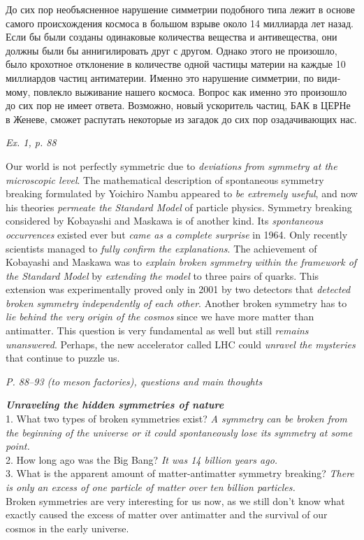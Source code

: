 \documentclass[a4paper, 12pt]{article}
\def\task#1{\begin{center}\it #1\end{center}}
\def\ans#1{\textit{#1}}
\begin{document}
\begin{otherlanguage}{russian}
	До сих пор необъясненное нарушение симметрии подобного типа лежит в основе самого 
	происхождения космоса в большом взрыве около 14 миллиарда лет назад. Если бы были 
	созданы одинаковые количества вещества и антивещества, они должны были бы 
	аннигилировать друг с другом. Однако этого не произошло, было крохотное отклонение 
	в количестве одной частицы материи на каждые 10 миллиардов частиц антиматерии. 
	Именно это нарушение симметрии, по видимому, повлекло выживание нашего космоса. 
	Вопрос как именно это произошло до сих пор не имеет ответа. Возможно, новый 
	ускоритель частиц, БАК в ЦЕРНе в Женеве, сможет распутать некоторые из загадок до 
	сих пор озадачивающих нас.
\end{otherlanguage}

\task{Ex. 1, p. 88}
Our world is not perfectly symmetric due to \textit{deviations from symmetry at the 
microscopic level}. The mathematical description of spontaneous symmetry breaking 
formulated by Yoichiro Nambu appeared to \textit{be extremely useful}, and now his 
theories \textit{permeate the Standard Model} of particle physics. Symmetry breaking 
considered by Kobayashi and Maskawa is of another kind. Its \textit{spontaneous 
occurrences} existed ever but \textit{came as a complete surprise} in 1964. Only 
recently scientists managed to \textit{fully confirm the explanations}. The 
achievement of Kobayashi and Maskawa was to \textit{explain broken symmetry within 
the framework of the Standard Model} by \textit{extending the model} to three pairs 
of quarks. This extension was experimentally proved only in 2001 by two detectors 
that \textit{detected broken symmetry independently of each other}. Another broken 
symmetry has to \textit{lie behind the very origin of the cosmos} since we have more 
matter than antimatter. This question is very fundamental as well but still 
\textit{remains unanswered}. Perhaps, the new accelerator called LHC could 
\textit{unravel the mysteries} that continue to puzzle us.

\task{P. 88--93 (to meson factories), questions and main thoughts}
\par\textbf{\textit{Unraveling the hidden symmetries of nature}}
\\1. What two types of broken symmetries exist? \ans{A symmetry can be broken from the beginning of the universe or it could spontaneously lose its symmetry at some point.}
\\2. How long ago was the Big Bang? \ans{It was 14 billion years ago.}
\\3. What is the apparent amount of matter-antimatter symmetry breaking? \ans{There is only an excess of one particle of matter over ten billion particles.}
\\ Broken symmetries are very interesting for us now, as we still don't know what exactly caused the excess of matter over antimatter and the survival of our cosmos in the early universe.
\end{document}
